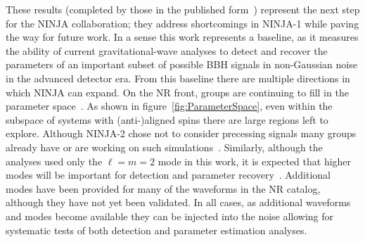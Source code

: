 % 

These results (completed by those in the published form~\cite{Aasi:2014tra})
represent the next step for the NINJA collaboration;
they address shortcomings in NINJA-1 while paving the way
for future work.  In a sense this work represents a baseline, as it
measures the ability of current gravitational-wave analyses to detect
and recover the parameters of an important subset of possible BBH
signals in non-Gaussian noise in the advanced detector era. 
From this baseline there are
multiple directions in which NINJA can expand. On the NR front,
groups are continuing to fill in the parameter space~\cite{Mroue:2013xna}.
As shown in
figure~\ref{fig:ParameterSpace}, even within the subspace of systems
with (anti-)aligned spins there are large regions left to explore.
Although NINJA-2 chose not to consider precessing signals many groups
already have or are working on such simulations~\cite{
Campanelli:2008nk, Tichy:2007hk, Tichy:2008du,Schmidt:2010it,
O'Shaughnessy:2011fx,Mroue:2012kv,O'Shaughnessy:2012vm,
O'Shaughnessy:2012ay,Hinder:2013oqa,Taracchini:2013rva}. Similarly, although 
the analyses used only the
$\ell=m=2$ mode in this work, it is expected that higher modes will be
important for detection and parameter
recovery~\cite{Pekowsky:2012sr,Healy:2013jza,McWilliams:2010eq,Brown:2012nn,
Pan:2011gk}.  Additional modes have been provided for many of
the waveforms in the NR catalog, although they have not yet been
validated.  In all cases, as additional waveforms and modes become
available they can be injected into the noise allowing for systematic
tests of both detection and parameter estimation analyses.

